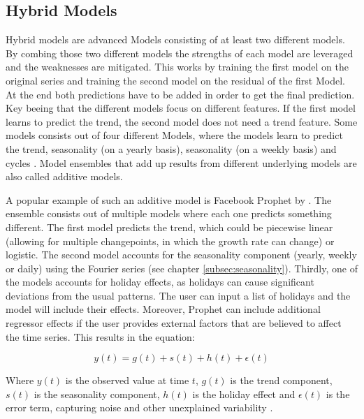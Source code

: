 \subsection*{Hybrid Models}
Hybrid models are advanced Models consisting of at least two different models. By combing those two different models the strengths of each model are leveraged and the weaknesses are mitigated. This works by training the first model on the original series and training the second model on the residual of the first Model. At the end both predictions have to be added in order to get the final prediction. Key beeing that the different models focus on different features. If the first model learns to predict the trend, the second model does not need a trend feature. Some models consists out of four different Models, where the models learn to predict the trend, seasonality (on a yearly basis), seasonality (on a weekly basis) and cycles \parencite{zunic2020application}. Model ensembles that add up results from different underlying models are also called additive models.

A popular example of such an additive model is Facebook Prophet by \textcite{prophetpaper}. The ensemble consists out of multiple models where each one predicts something different. The first model predicts the trend, which could be piecewise linear (allowing for multiple changepoints, in which the growth rate can change) or logistic. The second model accounts for the seasonality component (yearly, weekly or daily) using the Fourier series (see chapter \ref{subsec:seasonality}). Thirdly, one of the models accounts for holiday effects, as holidays can cause significant deviations from the usual patterns. The user can input a list of holidays and the model will include their effects. Moreover, Prophet can include additional regressor effects if the user provides external factors that are believed to affect the time series. This results in the equation:

$$y(t) = g(t)+s(t)+h(t)+\epsilon(t)$$

Where $y(t)$ is the observed value at time $t$, $g(t)$ is the trend component, $s(t)$ is the seasonality component, $h(t)$ is the holiday effect and $\epsilon(t)$ is the error term, capturing noise and other unexplained variability \parencite{prophetpaper}.

